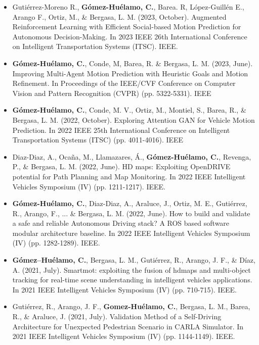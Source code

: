 \begin{refsection}
\begin{itemize}
\item Gutiérrez-Moreno R., \textbf{Gómez-Huélamo, C.}, Barea. R, López-Guillén E., Arango F., Ortiz, M., \& Bergasa, L. M. (2023, October). Augmented Reinforcement Learning with Efficient Social-based Motion Prediction for Autonomous Decision-Making. In 2023 IEEE 26th International Conference on Intelligent Transportation Systems (ITSC). IEEE.

\item \textbf{Gómez-Huélamo, C.}, Conde, M, Barea, R. \& Bergasa, L. M. (2023, June). Improving Multi-Agent Motion Prediction with Heuristic Goals and Motion Refinement. In Proceedings of the IEEE/CVF Conference on Computer Vision and Pattern Recognition (CVPR) (pp. 5322-5331). IEEE

\item \textbf{Gómez-Huélamo, C.}, Conde, M. V., Ortiz, M., Montiel, S., Barea, R., \& Bergasa, L. M. (2022, October). Exploring Attention GAN for Vehicle Motion Prediction. In 2022 IEEE 25th International Conference on Intelligent Transportation Systems (ITSC) (pp. 4011-4016). IEEE

\item Diaz-Diaz, A., Ocaña, M., Llamazares, Á., \textbf{Gómez-Huélamo, C.}, Revenga, P., \& Bergasa, L. M. (2022, June). HD maps: Exploiting OpenDRIVE potential for Path Planning and Map Monitoring. In 2022 IEEE Intelligent Vehicles Symposium (IV) (pp. 1211-1217). IEEE.

\item \textbf{Gómez-Huélamo, C.}, Diaz-Diaz, A., Araluce, J., Ortiz, M. E., Gutiérrez, R., Arango, F., ... \& Bergasa, L. M. (2022, June). How to build and validate a safe and reliable Autonomous Driving stack? A ROS based software modular architecture baseline. In 2022 IEEE Intelligent Vehicles Symposium (IV) (pp. 1282-1289). IEEE.

\item \textbf{Gómez–Huélamo, C.}, Bergasa, L. M., Gutiérrez, R., Arango, J. F., \& Díaz, A. (2021, July). Smartmot: exploiting the fusion of hdmaps and multi-object tracking for real-time scene understanding in intelligent vehicles applications. In 2021 IEEE Intelligent Vehicles Symposium (IV) (pp. 710-715). IEEE.

\item Gutiérrez, R., Arango, J. F., \textbf{Gomez-Huélamo, C.}, Bergasa, L. M., Barea, R., \& Araluce, J. (2021, July). Validation Method of a Self-Driving Architecture for Unexpected Pedestrian Scenario in CARLA Simulator. In 2021 IEEE Intelligent Vehicles Symposium (IV) (pp. 1144-1149). IEEE.


\end{itemize}
\end{refsection}
